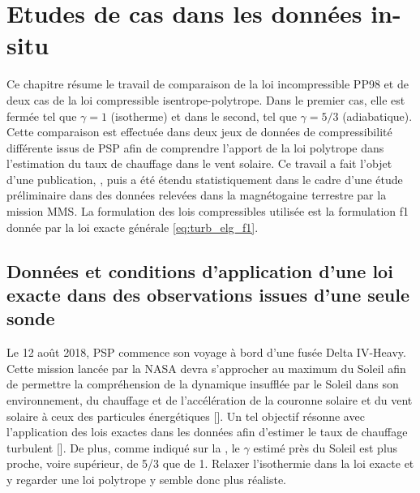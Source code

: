 \chapter{Etudes de cas dans les données in-situ }
\renewcommand\partie{\Partie\ Chapitre \thechapter}
\label{ch-14}

\minitoc  

\bigskip

Ce chapitre résume le travail de comparaison de la loi incompressible \acs{PP98} et de deux cas de la loi compressible isentrope-polytrope. Dans le premier cas, elle est fermée tel que $\gamma = 1$ (isotherme) et dans le second, tel que $\gamma = 5/3$ (adiabatique). Cette comparaison est effectuée dans deux jeux de données de compressibilité différente issus de \ac{PSP} afin de comprendre l'apport de la loi polytrope dans l'estimation du taux de chauffage dans le vent solaire. Ce travail a fait l'objet d'une publication, \cite{simon_general_2021}, puis a été étendu statistiquement dans le cadre d'une étude préliminaire dans des données relevées dans la magnétogaine terrestre par la mission \ac{MMS}. La formulation des lois compressibles utilisée est la formulation f1 donnée par la loi exacte générale \eqref{eq:turb_elg_f1}. 

\section{Données et conditions d'application d'une loi exacte dans des observations issues d'une seule sonde}
\label{sec-141}

Le 12 août 2018, \ac{PSP} commence son voyage à bord d'une fusée Delta IV-Heavy. Cette mission lancée par la \ac{NASA} devra s'approcher au maximum du Soleil afin de permettre la compréhension de la dynamique insufflée par le Soleil dans son environnement, du chauffage et de l'accélération de la couronne solaire et du vent solaire à ceux des particules énergétiques [\cite{fox_solar_2016}]. Un tel objectif résonne avec l'application des lois exactes dans les données afin d'estimer le taux de chauffage turbulent [\cite{parashar_observations_2022}]. De plus, comme indiqué sur la , le $\gamma$ estimé près du Soleil est plus proche, voire supérieur, de 5/3 que de 1. Relaxer l'isothermie dans la loi exacte et y regarder une loi polytrope y semble donc plus réaliste. 

